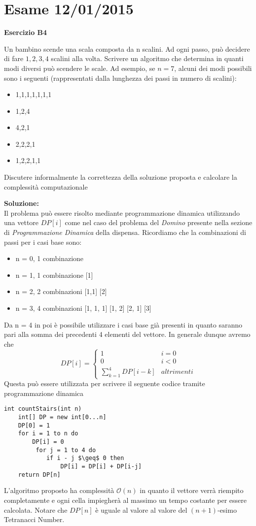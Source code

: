 \documentclass[../cheatSheetAlgoritmi.tex]{subfiles}
\begin{document}
\section{Esame 12/01/2015}
\textbf{Esercizio B4}

Un bambino scende una scala composta da n scalini. Ad ogni passo, può decidere di fare $1,2,3,4$ scalini alla volta. Scrivere un algoritmo che determina in quanti modi diversi può scendere le scale. Ad esempio, se $n= 7$, alcuni dei modi possibili sono i seguenti (rappresentati dalla lunghezza dei passi in numero di scalini):
\begin{itemize}
	\item 1,1,1,1,1,1,1
	\item 1,2,4
	\item 4,2,1
	\item 2,2,2,1
	\item 1,2,2,1,1
\end{itemize}
Discutere informalmente la correttezza della soluzione proposta e calcolare la complessità computazionale

\textbf{Soluzione:}\\
Il problema può essere risolto mediante programmazione dinamica utilizzando una vettore $DP[i]$ come nel caso del problema del \emph{Domino} presente nella sezione di \emph{Programmazione Dinamica} della dispensa. Ricordiamo che la combinazioni di passi per i casi base sono:
\begin{itemize}
	\item n = 0, 1 combinazione
	\item n = 1, 1 combinazione 	[1]
	\item n = 2, 2 combinazioni	[1,1] [2]
	\item n = 3, 4 combinazioni	[1, 1, 1] [1, 2] [2, 1] [3]
\end{itemize}
Da n = 4 in poi è possibile utilizzare i casi base già presenti in quanto saranno pari alla somma dei precedenti 4 elementi del vettore. In generale dunque avremo che 
\begin{equation*}
  	DP[i]=\begin{cases}
  		1 & \text{$i = 0$}\\
  		0 & \text{$i < 0$}\\
  		\sum_{k = 1}^{4}{DP[i-k]} & \text{$altrimenti$}
  	\end{cases}
\end{equation*}
Questa può essere utilizzata per scrivere il seguente codice tramite programmazione dinamica
\begin{lstlisting}[caption=modi per scendere le scale]
int countStairs(int n)
	int[] DP = new int[0...n]
	DP[0] = 1
	for i = 1 to n do
		DP[i] = 0
		 for j = 1 to 4 do
		 	if i - j $\geq$ 0 then
		 		DP[i] = DP[i] + DP[i-j]
	return DP[n]
\end{lstlisting}
L'algoritmo proposto ha complessità $\mathcal{O}(n)$ in quanto il vettore verrà riempito completamente e ogni cella impiegherà al massimo un tempo costante per essere calcolata. Notare che $DP[n]$ è uguale al valore al valore del $(n+1)$-esimo Tetranacci Number.
\newpage
\end{document}
